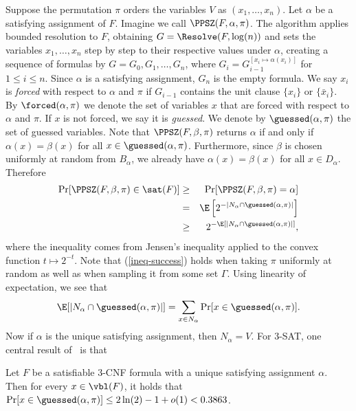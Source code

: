 Suppose the permutation $\pi$ orders the
variables $V$ as $(x_1,\dots,x_n)$. Let $\alpha$ be a satisfying
assignment of $F$. Imagine we call $\PPSZ(F,\alpha,\pi)$. The
algorithm applies bounded resolution to $F$, obtaining $G =
\Resolve(F,\log(n))$ and sets the variables $x_1,\dots,x_n$
step by step to their respective values under $\alpha$, creating a
sequence of formulas by $G=G_0,G_1,\dots,G_n$, where $G_{i} =
G_{i-1}^{[x_i \mapsto \alpha(x_i)]}$ for $1 \leq i \leq n$. Since
$\alpha$ is a satisfying assignment, $G_n$ is the empty formula. We
say $x_i$ is {\em forced} with respect to $\alpha$ and $\pi$ if
$G_{i-1}$ contains the unit clause $\{x_i\}$ or $\{\bar{x}_i\}$. By
$\forced(\alpha,\pi)$ we denote the set of variables $x$ that are
forced with respect to $\alpha$ and $\pi$. If $x$ is not forced, we
say it is {\em guessed}. We denote by $\guessed(\alpha,\pi)$ the set
of guessed variables. Note that $\PPSZ(F,\beta,\pi)$ returns $\alpha$
if and only if $\alpha(x) = \beta(x)$ for all $x \in
\guessed(\alpha,\pi)$.  Furthermore, since $\beta$ is chosen uniformly
at random from $B_\alpha$, we already have $\alpha(x)=\beta(x)$ for
all $x \in D_\alpha$. Therefore
\begin{eqnarray}
	\Pr[\PPSZ(F,\beta,\pi)\in\sat(F)] & \geq & 
  \Pr[\PPSZ(F,\beta,\pi)=\alpha] \\ & = & 
  \E\left[2^{-|N_\alpha \cap \guessed(\alpha,\pi)|}\right] \nonumber \\
  & \geq &
  2^{-\E[|N_\alpha \cap \guessed(\alpha,\pi)|]},\label{ineq-success}
\end{eqnarray}
where the inequality comes from Jensen's inequality applied to the
convex function $t \mapsto 2^{-t}$. Note that (\ref{ineq-success})
holds when taking $\pi$ uniformly at random as well as when sampling
it from some set $\Gamma$. Using linearity of expectation, we see that
\begin{eqnarray}
\E[|N_\alpha \cap \guessed(\alpha,\pi)|] = 
\sum_{x \in N_\alpha}\Pr[x \in \guessed(\alpha,\pi)].
\label{sum-of-unforced}
\end{eqnarray}
Now if $\alpha$ is the unique satisfying assignment, then $N_\alpha =
V$. For $3$-SAT, one central result of~\cite{ppsz} is that
\begin{lemma}
  Let $F$ be a satisfiable $3$-CNF formula with a unique satisfying
  assignment $\alpha$. Then for every $x \in \vbl(F)$, it holds that
  $\Pr[x \in \guessed(\alpha,\pi)] \leq 2\ln(2)-1+o(1) < 0.3863$.
\label{lemma-unique-forced}
\end{lemma}

